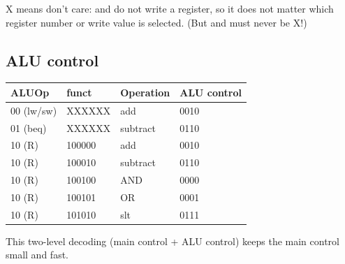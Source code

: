 \begin{center}
\end{center}

X means don't care:  and  do not write a register, so it
does not matter which register number or write value is selected. (But
 and  must never be X!)

\subsection{ALU control}

\begin{center}
\begin{tabular}{llll}
\toprule
ALUOp & funct & Operation & ALU control \\
\midrule
00 (lw/sw) & XXXXXX & add & 0010 \\
01 (beq) & XXXXXX & subtract & 0110 \\
10 (R) & 100000 & add & 0010 \\
10 (R) & 100010 & subtract & 0110 \\
10 (R) & 100100 & AND & 0000 \\
10 (R) & 100101 & OR & 0001 \\
10 (R) & 101010 & slt & 0111 \\
\bottomrule
\end{tabular}
\end{center}

This two-level decoding (main control + ALU control) keeps the main
control small and fast.

